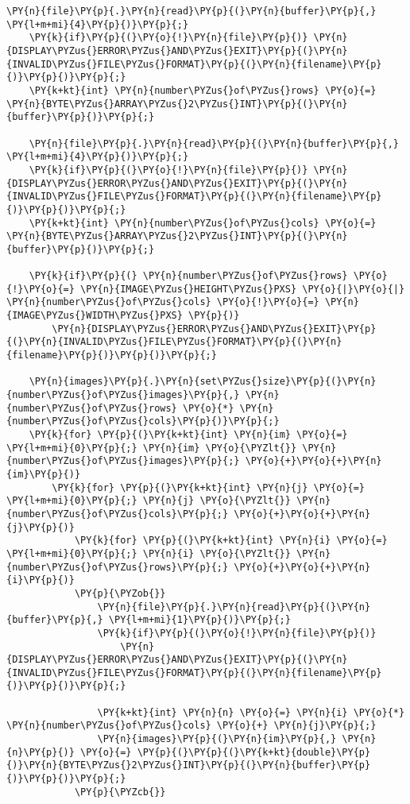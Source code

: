 \begin{Verbatim}[commandchars=\\\{\}]
	\PY{n}{file}\PY{p}{.}\PY{n}{read}\PY{p}{(}\PY{n}{buffer}\PY{p}{,} \PY{l+m+mi}{4}\PY{p}{)}\PY{p}{;}
	\PY{k}{if}\PY{p}{(}\PY{o}{!}\PY{n}{file}\PY{p}{)} \PY{n}{DISPLAY\PYZus{}ERROR\PYZus{}AND\PYZus{}EXIT}\PY{p}{(}\PY{n}{INVALID\PYZus{}FILE\PYZus{}FORMAT}\PY{p}{(}\PY{n}{filename}\PY{p}{)}\PY{p}{)}\PY{p}{;}
	\PY{k+kt}{int} \PY{n}{number\PYZus{}of\PYZus{}rows} \PY{o}{=} \PY{n}{BYTE\PYZus{}ARRAY\PYZus{}2\PYZus{}INT}\PY{p}{(}\PY{n}{buffer}\PY{p}{)}\PY{p}{;}
	
	\PY{n}{file}\PY{p}{.}\PY{n}{read}\PY{p}{(}\PY{n}{buffer}\PY{p}{,} \PY{l+m+mi}{4}\PY{p}{)}\PY{p}{;}
	\PY{k}{if}\PY{p}{(}\PY{o}{!}\PY{n}{file}\PY{p}{)} \PY{n}{DISPLAY\PYZus{}ERROR\PYZus{}AND\PYZus{}EXIT}\PY{p}{(}\PY{n}{INVALID\PYZus{}FILE\PYZus{}FORMAT}\PY{p}{(}\PY{n}{filename}\PY{p}{)}\PY{p}{)}\PY{p}{;}
	\PY{k+kt}{int} \PY{n}{number\PYZus{}of\PYZus{}cols} \PY{o}{=} \PY{n}{BYTE\PYZus{}ARRAY\PYZus{}2\PYZus{}INT}\PY{p}{(}\PY{n}{buffer}\PY{p}{)}\PY{p}{;}
	
	\PY{k}{if}\PY{p}{(} \PY{n}{number\PYZus{}of\PYZus{}rows} \PY{o}{!}\PY{o}{=} \PY{n}{IMAGE\PYZus{}HEIGHT\PYZus{}PXS} \PY{o}{|}\PY{o}{|} \PY{n}{number\PYZus{}of\PYZus{}cols} \PY{o}{!}\PY{o}{=} \PY{n}{IMAGE\PYZus{}WIDTH\PYZus{}PXS} \PY{p}{)}
		\PY{n}{DISPLAY\PYZus{}ERROR\PYZus{}AND\PYZus{}EXIT}\PY{p}{(}\PY{n}{INVALID\PYZus{}FILE\PYZus{}FORMAT}\PY{p}{(}\PY{n}{filename}\PY{p}{)}\PY{p}{)}\PY{p}{;}

	\PY{n}{images}\PY{p}{.}\PY{n}{set\PYZus{}size}\PY{p}{(}\PY{n}{number\PYZus{}of\PYZus{}images}\PY{p}{,} \PY{n}{number\PYZus{}of\PYZus{}rows} \PY{o}{*} \PY{n}{number\PYZus{}of\PYZus{}cols}\PY{p}{)}\PY{p}{;}
	\PY{k}{for} \PY{p}{(}\PY{k+kt}{int} \PY{n}{im} \PY{o}{=} \PY{l+m+mi}{0}\PY{p}{;} \PY{n}{im} \PY{o}{\PYZlt{}} \PY{n}{number\PYZus{}of\PYZus{}images}\PY{p}{;} \PY{o}{+}\PY{o}{+}\PY{n}{im}\PY{p}{)}
		\PY{k}{for} \PY{p}{(}\PY{k+kt}{int} \PY{n}{j} \PY{o}{=} \PY{l+m+mi}{0}\PY{p}{;} \PY{n}{j} \PY{o}{\PYZlt{}} \PY{n}{number\PYZus{}of\PYZus{}cols}\PY{p}{;} \PY{o}{+}\PY{o}{+}\PY{n}{j}\PY{p}{)}
			\PY{k}{for} \PY{p}{(}\PY{k+kt}{int} \PY{n}{i} \PY{o}{=} \PY{l+m+mi}{0}\PY{p}{;} \PY{n}{i} \PY{o}{\PYZlt{}} \PY{n}{number\PYZus{}of\PYZus{}rows}\PY{p}{;} \PY{o}{+}\PY{o}{+}\PY{n}{i}\PY{p}{)}
			\PY{p}{\PYZob{}}
				\PY{n}{file}\PY{p}{.}\PY{n}{read}\PY{p}{(}\PY{n}{buffer}\PY{p}{,} \PY{l+m+mi}{1}\PY{p}{)}\PY{p}{;}
				\PY{k}{if}\PY{p}{(}\PY{o}{!}\PY{n}{file}\PY{p}{)}
					\PY{n}{DISPLAY\PYZus{}ERROR\PYZus{}AND\PYZus{}EXIT}\PY{p}{(}\PY{n}{INVALID\PYZus{}FILE\PYZus{}FORMAT}\PY{p}{(}\PY{n}{filename}\PY{p}{)}\PY{p}{)}\PY{p}{;}

				\PY{k+kt}{int} \PY{n}{n} \PY{o}{=} \PY{n}{i} \PY{o}{*} \PY{n}{number\PYZus{}of\PYZus{}cols} \PY{o}{+} \PY{n}{j}\PY{p}{;}
				\PY{n}{images}\PY{p}{(}\PY{n}{im}\PY{p}{,} \PY{n}{n}\PY{p}{)} \PY{o}{=} \PY{p}{(}\PY{p}{(}\PY{k+kt}{double}\PY{p}{)}\PY{n}{BYTE\PYZus{}2\PYZus{}INT}\PY{p}{(}\PY{n}{buffer}\PY{p}{)}\PY{p}{)}\PY{p}{;}
			\PY{p}{\PYZcb{}}


\end{Verbatim}
